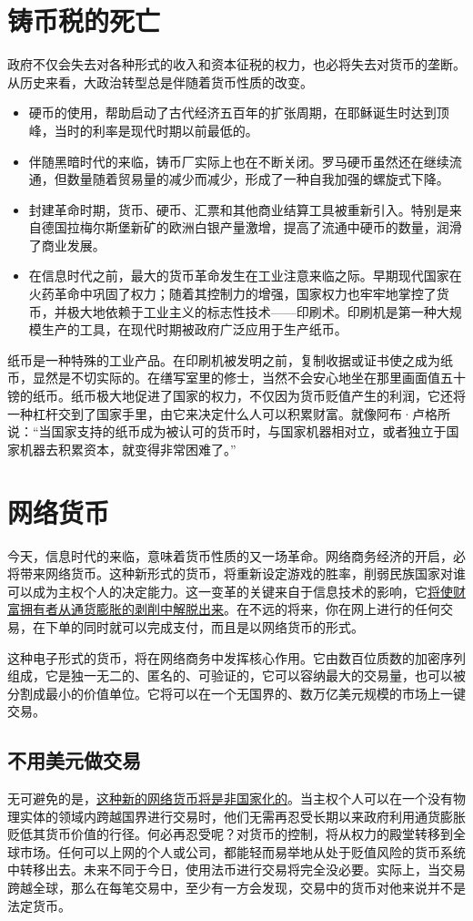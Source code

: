 \section{铸币税的死亡}
政府不仅会失去对各种形式的收入和资本征税的权力，也必将失去对货币的垄断。从历史来看，大政治转型总是伴随着货币性质的改变。
\begin{itemize}
    \item 硬币的使用，帮助启动了古代经济五百年的扩张周期，在耶稣诞生时达到顶峰，当时的利率是现代时期以前最低的。
    \item 伴随黑暗时代的来临，铸币厂实际上也在不断关闭。罗马硬币虽然还在继续流通，但数量随着贸易量的减少而减少，形成了一种自我加强的螺旋式下降。
    \item 封建革命时期，货币、硬币、汇票和其他商业结算工具被重新引入。特别是来自德国拉梅尔斯堡新矿的欧洲白银产量激增，提高了流通中硬币的数量，润滑了商业发展。
    \item 在信息时代之前，最大的货币革命发生在工业注意来临之际。早期现代国家在火药革命中巩固了权力；随着其控制力的增强，国家权力也牢牢地掌控了货币，并极大地依赖于工业主义的标志性技术——印刷术。印刷机是第一种大规模生产的工具，在现代时期被政府广泛应用于生产纸币。
\end{itemize}

纸币是一种特殊的工业产品。在印刷机被发明之前，复制收据或证书使之成为纸币，显然是不切实际的。在缮写室里的修士，当然不会安心地坐在那里画面值五十镑的纸币。纸币极大地促进了国家的权力，不仅因为货币贬值产生的利润，它还将一种杠杆交到了国家手里，由它来决定什么人可以积累财富。就像阿布·卢格所说：“当国家支持的纸币成为被认可的货币时，与国家机器相对立，或者独立于国家机器去积累资本，就变得非常困难了。”

\section{网络货币}
今天，信息时代的来临，意味着货币性质的又一场革命。网络商务经济的开启，必将带来网络货币。这种新形式的货币，将重新设定游戏的胜率，削弱民族国家对谁可以成为主权个人的决定能力。这一变革的关键来自于信息技术的影响，它\uline{将使财富拥有者从通货膨胀的剥削中解脱出来}。在不远的将来，你在网上进行的任何交易，在下单的同时就可以完成支付，而且是以网络货币的形式。

这种电子形式的货币，将在网络商务中发挥核心作用。它由数百位质数的加密序列组成，它是独一无二的、匿名的、可验证的，它可以容纳最大的交易量，也可以被分割成最小的价值单位。它将可以在一个无国界的、数万亿美元规模的市场上一键交易。

\subsection{不用美元做交易}
无可避免的是，\uline{这种新的网络货币将是非国家化的}。当主权个人可以在一个没有物理实体的领域内跨越国界进行交易时，他们无需再忍受长期以来政府利用通货膨胀贬低其货币价值的行径。何必再忍受呢？对货币的控制，将从权力的殿堂转移到全球市场。任何可以上网的个人或公司，都能轻而易举地从处于贬值风险的货币系统中转移出去。未来不同于今日，使用法币进行交易将完全没必要。实际上，当交易跨越全球，那么在每笔交易中，至少有一方会发现，交易中的货币对他来说并不是法定货币。

